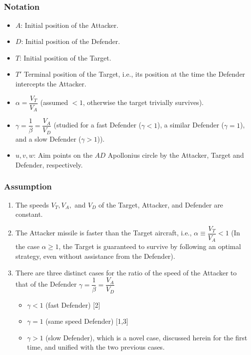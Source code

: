 \documentclass{beamer}
\begin{document}
\subsection{}
\begin{frame}
\frametitle{Notation}
\begin{itemize}
	\item $A$: Initial position of the Attacker.
	\item $D$: Initial position of the Defender.
	\item $T$: Initial position of the Target.
	\item $T'$ Terminal position of the Target, i.e., its position at the time the Defender intercepts the Attacker.
	\item $\alpha=\dfrac{V_{T}}{V_{A}}$ (assumed $<1$, otherwise the target trivially survives).
	\item $\gamma=\dfrac{1}{\beta}=\dfrac{V_{A}}{V_{D}}$ (studied for a fast Defender ($\gamma<1$), a similar Defender ($\gamma=1$), and a slow Defender ($\gamma>1$)).
	\item $u, v, w$: Aim points on the $AD$ Apollonius circle by the Attacker, Target and Defender, respectively. 
\end{itemize}
\end{frame}
\begin{frame}
\frametitle{Assumption}
\begin{enumerate}
\item The speeds $V_{T},V_{A},$ and $V_{D}$ of the Target, Attacker, and Defender are constant.
\item The Attacker missile is faster than the Target aircraft, i.e., $\alpha\equiv \dfrac{V_{T}}{V_{A}}<1$ (In the case $\alpha\geq1$, the Target is guaranteed to survive by following an optimal strategy, even without assistance from the Defender).
\item There are three distinct cases for the ratio of the speed of the Attacker to that of the Defender $\gamma=\dfrac{1}{\beta}=\dfrac{V_{A}}{V_{D}}$ 
\begin{itemize}
	\item $\gamma<1$ (fast Defender) [2]
	\item $\gamma =1$ (same speed Defender) [1,3]
	\item $\gamma>1$ (slow Defender), which is a novel case, discussed herein for the first time, and unified with the two previous cases.  
\end{itemize}
\end{enumerate}
\end{frame}
\end{document}
